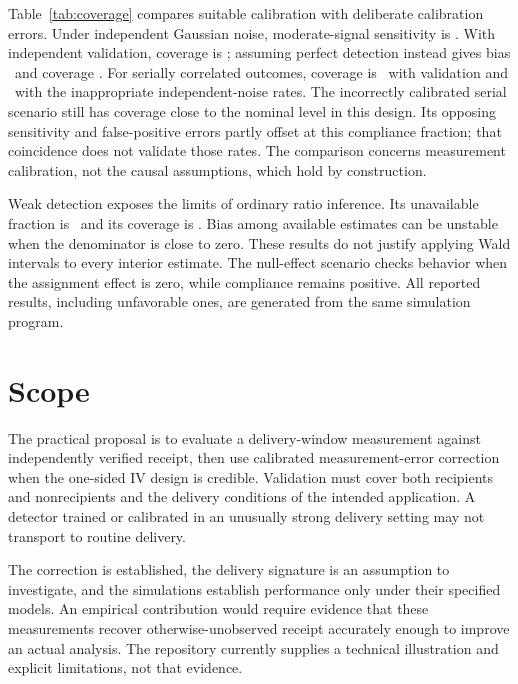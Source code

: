\documentclass[11pt]{article}
\begin{document}
Table~\ref{tab:coverage} compares suitable calibration with deliberate calibration errors. Under independent Gaussian noise, moderate-signal sensitivity is \ModerateSensitivity. With independent validation, coverage is \ModerateCoverage; assuming perfect detection instead gives bias \PerfectBias\ and coverage \PerfectCoverage. For serially correlated outcomes, coverage is \SerialCoverage\ with validation and \WrongSerialCoverage\ with the inappropriate independent-noise rates. The incorrectly calibrated serial scenario still has coverage close to the nominal level in this design. Its opposing sensitivity and false-positive errors partly offset at this compliance fraction; that coincidence does not validate those rates. The comparison concerns measurement calibration, not the causal assumptions, which hold by construction.

Weak detection exposes the limits of ordinary ratio inference. Its unavailable fraction is \WeakUnavailable\ and its coverage is \WeakCoverage. Bias among available estimates can be unstable when the denominator is close to zero. These results do not justify applying Wald intervals to every interior estimate. The null-effect scenario checks behavior when the assignment effect is zero, while compliance remains positive. All reported results, including unfavorable ones, are generated from the same simulation program.

\section{Scope}

The practical proposal is to evaluate a delivery-window measurement against independently verified receipt, then use calibrated measurement-error correction when the one-sided IV design is credible. Validation must cover both recipients and nonrecipients and the delivery conditions of the intended application. A detector trained or calibrated in an unusually strong delivery setting may not transport to routine delivery.

The correction is established, the delivery signature is an assumption to investigate, and the simulations establish performance only under their specified models. An empirical contribution would require evidence that these measurements recover otherwise-unobserved receipt accurately enough to improve an actual analysis. The repository currently supplies a technical illustration and explicit limitations, not that evidence.



\end{document}
